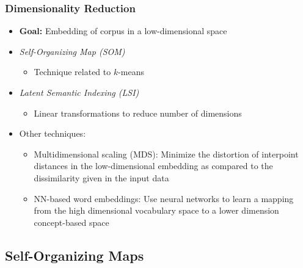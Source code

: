 \documentclass{beamer}
\begin{document}
\begin{frame}
  \frametitle{Dimensionality Reduction}

  \begin{itemize}
  \item \textbf{Goal:} Embedding of corpus in a low-dimensional space
  \item \emph{Self-Organizing Map (SOM)}
    \begin{itemize}
    \item Technique related to $k$-means
    \end{itemize}
  \item \emph{Latent Semantic Indexing (LSI)}
      \begin{itemize}
      \item Linear transformations to reduce number of dimensions
      \end{itemize}
  \item Other techniques:
      \begin{itemize}
      \item Multidimensional scaling (MDS): Minimize the distortion of interpoint distances in the
          low-dimensional embedding as compared to the dissimilarity given in the
          input data
      \item NN-based word embeddings: Use neural networks to learn a mapping
          from the high dimensional vocabulary space to a lower dimension
          concept-based space
      \end{itemize}
  \end{itemize}

\end{frame}


\subsection{Self-Organizing Maps}
\end{document}
